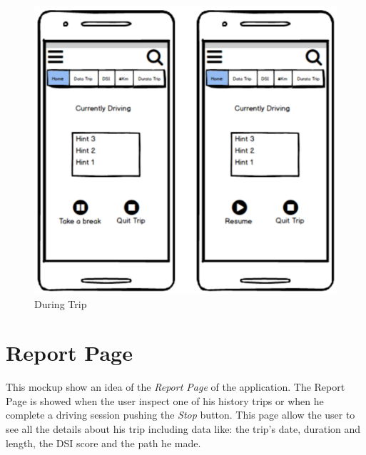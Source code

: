 \begin{figure}[htbp]
\centering
\includegraphics[width=\textwidth]{cpt/img/DuringTrip.png}
\caption{During Trip}
\end{figure}

\clearpage
\section{Report Page}
This mockup show an idea of the \textit{Report Page} of the application. The Report Page is showed when the user inspect one of his history trips or when he complete a driving session pushing the \textit{Stop} button. This page allow the user to see all the details about his trip including data like: the trip's date, duration and length, the DSI score and the path he made.\\


